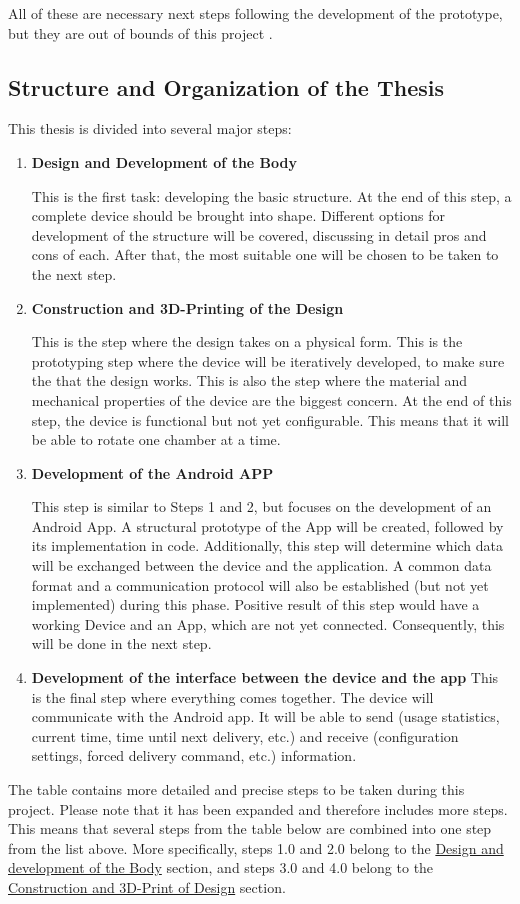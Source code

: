 All of these are necessary next steps following the development of the prototype, but they are out of bounds of this project .
\newpage
\subsection{Structure and Organization of the Thesis}
This thesis is divided into several major steps:
\begin{enumerate}
	\item{\textbf{Design and Development of the Body}}
	
	This is the first task: developing the basic structure. At the end of this step, a complete device should be brought into shape. Different options for development of the structure will be covered, discussing in detail pros and cons of each. After that, the most suitable one will be chosen to be taken to the next step.
	\item{\textbf{Construction and 3D-Printing of the Design}}
	
	This is the step where the design takes on a physical form. This is the prototyping step where the device will be iteratively developed, to make sure the that the design works. This is also the step where the material and mechanical properties of the device are the biggest concern. At the end of this step, the device is functional but not yet configurable. This means that it will be able to rotate one chamber at a time.
	\item{\textbf{Development of the Android APP}}
	
	This step is similar to Steps 1 and 2, but focuses on the development of an Android App. A structural prototype of the App will be created, followed by its implementation in code. Additionally, this step will determine which data will be exchanged between the device and the application. A common data format and a communication protocol will also be established (but not yet implemented) during this phase.
	Positive result of this step would have a working Device and an App, which are not yet connected. Consequently, this will be done in the next step.
	\item{\textbf{\textbf{Development of the interface between the device and the app}}}
	This is the final step where everything comes together. The device will communicate with the Android app. It will be able to send (usage statistics, current time, time until next delivery, etc.) and receive (configuration settings, forced delivery command, etc.) information.
\end{enumerate}
The table contains more detailed and precise steps to be taken during this project. Please note that it has been expanded and therefore includes more steps. This means that several steps from the table below are combined into one step from the list above. More specifically, steps 1.0 and 2.0 belong to the \hyperref[sec:Bodydesign]{Design and development of the Body} section, and steps 3.0 and 4.0 belong to the \hyperref[sec:3DPrint]{Construction and 3D-Print of Design} section.
\newpage
